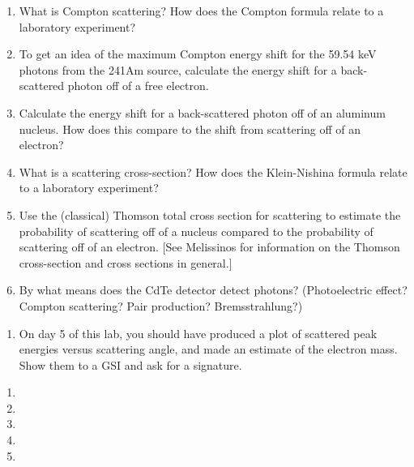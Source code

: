 \documentclass{../signatures}
\begin{document}
\maketitle

\names

\prelab

\begin{enumerate}

    \item What is Compton scattering? How does the Compton formula relate to a laboratory experiment?
    
    \item To get an idea of the maximum Compton energy shift for the 59.54 keV photons from the 241Am source, calculate the energy shift for a back-scattered photon off of a free electron.

    \item Calculate the energy shift for a back-scattered photon off of an aluminum nucleus. How does this compare to the shift from scattering off of an electron?

    \item What is a scattering cross-section? How does the Klein-Nishina formula relate to a laboratory experiment?

    \item Use the (classical) Thomson total cross section for scattering to estimate the probability of scattering off of a nucleus compared to the probability of scattering off of an electron. [See Melissinos for information on the Thomson cross-section and cross sections in general.]

    \item By what means does the CdTe detector detect photons? (Photoelectric effect? Compton scattering? Pair production? Bremsstrahlung?)
       \\[36pt]
\end{enumerate}

\prelabsignatures

\midlab

\begin{enumerate}

    \item On day 5 of this lab, you should have produced a plot of scattered peak energies versus scattering angle, and made an estimate of the electron mass. Show them to a GSI and ask for a signature.
\\[36pt]
\end{enumerate}


\checkpointsection 

\begin{enumerate}

\item {}

\item {}

\item {}

\item {}

\item {}

\end{enumerate}
\end{document}
